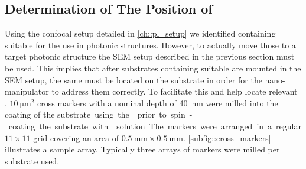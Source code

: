 	\subsection{Determination of The Position of \Nds} \label{subsec::position}

		Using the confocal setup detailed in \cref{ch::pl_setup} we identified \nds containing \sivs suitable for the use in photonic structures. However, to actually move those \nds to a target photonic structure the SEM setup described in the previous section must be used. This implies that after substrates containing suitable \nds are mounted in the SEM setup, the same \nds must be located on the substrate in order for the nano-manipulator to address them correctly.
		To facilitate this and help locate relevant \nds, $\SI{10}{\micro\meter\squared}$ cross markers with a nominal depth of \SI{40}{\nm} were milled into the \ir coating of the \si substrate using the \fib prior to spin-coating the substrate with \nd solution. The markers were arranged in a regular $11 \times 11$ grid covering an area of $\SI{0.5}{\milli\meter} \times \SI{0.5}{\milli\meter}$. \cref{subfig::cross_markers} illustrates a sample array. Typically three arrays of markers were milled per substrate used.

